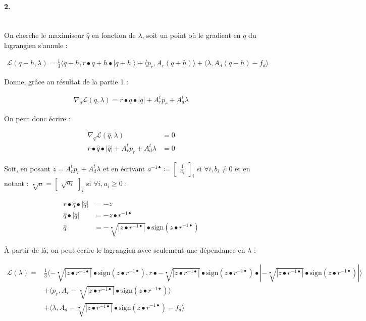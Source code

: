 \documentclass[11pt]{article}
\begin{document}
\paragraph{2.} ~\\


On cherche le maximiseur $\hat{q}$ en fonction de $\lambda$, soit un point où le gradient en $q$ du lagrangien s'annule :

\begin{align*}
  \mathcal{L}(q + h, \lambda) = \frac{1}{3} \langle q + h, r \bullet q + h \bullet |q + h| \rangle + \langle p_r, A_r (q + h) \rangle + \langle \lambda , A_d (q + h) - f_d \rangle
\end{align*}

Donne, grâce au résultat de la partie 1 :

\begin{align*}
  \nabla_q \mathcal{L}(q, \lambda) = r \bullet q \bullet |q| + A_r^t p_r + A_d^t \lambda
\end{align*}

On peut donc écrire :

\begin{align*}
  \nabla_q \mathcal{L}(\hat{q} , \lambda) &= 0 \\
  r \bullet \hat{q} \bullet |\hat{q}| + A_r^t p_r + A_d^t \lambda &= 0
\end{align*}

Soit, en posant $z = A_r^t p_r + A_d^t \lambda$ et en écrivant $a^{-1 \bullet} \coloneqq \begin{bmatrix} \frac{1}{a_i} \end{bmatrix}_i$ si $\forall i, b_i \ne 0$ et en notant : $\sqrt[\bullet]{a} = \begin{bmatrix} \sqrt{a_i} \end{bmatrix}_i$ si $\forall i, a_i \ge 0$ :

\begin{align*}
  r \bullet \hat{q} \bullet |\hat{q}| &= - z \\
  \hat{q} \bullet |\hat{q}| &= -z \bullet r^{-1 \bullet} \\
  \hat{q} &= \boxed{ - \sqrt[\bullet]{|z \bullet r^{-1 \bullet}|} \bullet \text{sign}(z \bullet r^{-1 \bullet}) }
\end{align*}

À partir de là, on peut écrire le lagrangien avec seulement une dépendance en $\lambda$ :

\begin{align*}
  \mathcal{L}(\lambda) =& \frac{1}{3} \langle - \sqrt[\bullet]{|z \bullet r^{-1 \bullet}|} \bullet \text{sign}(z \bullet r^{-1 \bullet}), r \bullet - \sqrt[\bullet]{|z \bullet r^{-1 \bullet}|} \bullet \text{sign}(z \bullet r^{-1 \bullet}) \bullet |- \sqrt[\bullet]{|z \bullet r^{-1 \bullet}|} \bullet \text{sign}(z \bullet r^{-1 \bullet})| \rangle \\
  &+ \langle p_r, A_r - \sqrt[\bullet]{|z \bullet r^{-1 \bullet}|} \bullet \text{sign}(z \bullet r^{-1 \bullet}) \rangle \\
  &+ \langle \lambda , A_d - \sqrt[\bullet]{|z \bullet r^{-1 \bullet}|} \bullet \text{sign}(z \bullet r^{-1 \bullet}) - f_d \rangle
\end{align*}
\end{document}
